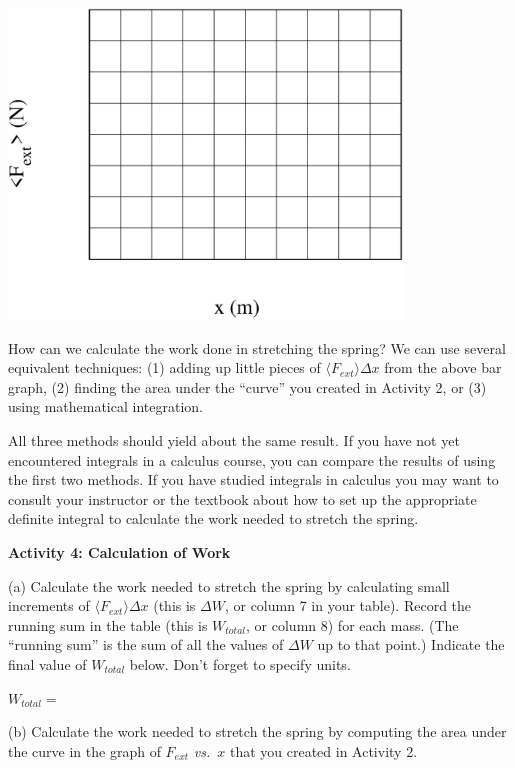 \vspace{0.3cm}
{\par\centering \includegraphics[height=3.250in]{work_kinetic/workAndKEF2.eps} \par}
\vspace{0.3cm}

How can we calculate the work done in stretching the spring? We can use several
equivalent techniques: (1) adding up little pieces of \( \langle F_{ext} 
\rangle \Delta x \) from the above bar graph,
(2) finding the area under the ``curve'' you created in Activity 2, or (3)
using mathematical integration.

All three methods should yield about the same result. If you have not yet encountered
integrals in a calculus course, you can compare the results of using the first
two methods. If you have studied integrals in calculus you may want to consult
your instructor or the textbook about how to set up the appropriate definite
integral to calculate the work needed to stretch the spring. 

\textbf{Activity 4: Calculation of Work }

(a) Calculate the work needed to stretch the spring by calculating small increments of \( \langle F_{ext} \rangle \Delta  x\) (this is \( \Delta W\), or column 7 in your table). Record the running sum in the table (this is \( W_{total} \), or column 8) for each mass. (The ``running sum'' is the sum of all the values of \( \Delta W\) up to that point.) Indicate the final value of \( W_{total} \) below. Don't forget to specify units.
\vspace{5mm}

\( W_{total} =\) 
\vspace{5mm}

(b) Calculate the work needed to stretch the spring by computing the area under
the curve in the graph of \( F_{ext} \) \textit{vs.}~$x$ that you created in Activity 2.
\answerspace{20mm}

